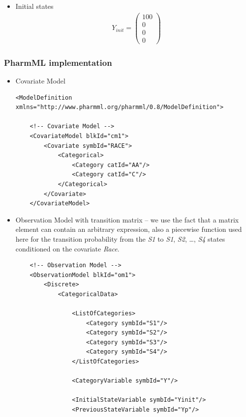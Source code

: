 \begin{itemize}
\item
Initial states
\begin{align}
& Y_{init} = \left( \begin{array}{c} 100 \\ 0 \\ 0 \\ 0 \end{array} \right) \nonumber
\end{align}
\end{itemize}

\subsubsection*{PharmML implementation}

\begin{itemize}
\item
Covariate Model 
\lstset{language=XML}
\begin{lstlisting}
<ModelDefinition xmlns="http://www.pharmml.org/pharmml/0.8/ModelDefinition">
    
    <!-- Covariate Model -->
    <CovariateModel blkId="cm1">
        <Covariate symbId="RACE">
            <Categorical>
                <Category catId="AA"/>
                <Category catId="C"/>
            </Categorical>
        </Covariate>
    </CovariateModel>
\end{lstlisting}

\item
Observation Model with transition matrix -- we use the fact that a matrix element 
can contain an arbitrary expression, also a piecewise function used here for the 
transition probability from the \emph{S1} to \emph{S1}, \emph{S2}, \dots, 
\emph{S4} states conditioned on the covariate \emph{Race}. 
\lstset{language=XML}
\begin{lstlisting}    
    <!-- Observation Model -->
    <ObservationModel blkId="om1">
        <Discrete>
            <CategoricalData>
                
                <ListOfCategories> 
                    <Category symbId="S1"/>
                    <Category symbId="S2"/>
                    <Category symbId="S3"/>
                    <Category symbId="S4"/>
                </ListOfCategories>
                
                <CategoryVariable symbId="Y"/>
                
                <InitialStateVariable symbId="Yinit"/> 
                <PreviousStateVariable symbId="Yp"/>
                

\end{lstlisting}
\end{itemize}
